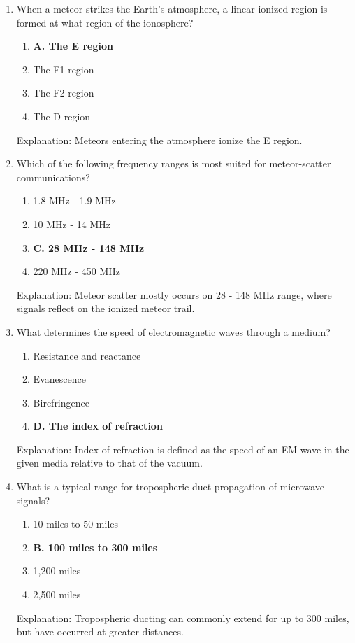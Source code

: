 \begin{enumerate}
    \item When a meteor strikes the Earth's atmosphere, a linear ionized region is formed at what region of the ionosphere?
        \begin{enumerate}
         \item \textbf{A. The E region}
        \item  The F1 region
     \item  The F2 region
       \item  The D region
    \end{enumerate}
    \textcolor{myred}{Explanation:}
      Meteors entering the atmosphere ionize the E region.
        
       \item Which of the following frequency ranges is most suited for meteor-scatter communications?
       \begin{enumerate}
           \item  1.8 MHz - 1.9 MHz
     \item  10 MHz - 14 MHz
    \item \textbf{C. 28 MHz - 148 MHz}
      \item  220 MHz - 450 MHz
        \end{enumerate}
     \textcolor{myred}{Explanation:}
      Meteor scatter mostly occurs on 28 - 148 MHz range, where signals reflect on the ionized meteor trail.

        \item What determines the speed of electromagnetic waves through a medium?
    \begin{enumerate}
        \item  Resistance and reactance
         \item  Evanescence
         \item  Birefringence
        \item \textbf{D. The index of refraction}
    \end{enumerate}
     \textcolor{myred}{Explanation:}
      Index of refraction is defined as the speed of an EM wave in the given media relative to that of the vacuum.
        
        \item What is a typical range for tropospheric duct propagation of microwave signals?
       \begin{enumerate}
        \item  10 miles to 50 miles
          \item \textbf{B. 100 miles to 300 miles}
        \item  1,200 miles
       \item  2,500 miles
       \end{enumerate}
     \textcolor{myred}{Explanation:}
     Tropospheric ducting can commonly extend for up to 300 miles, but have occurred at greater distances.


\end{enumerate}
